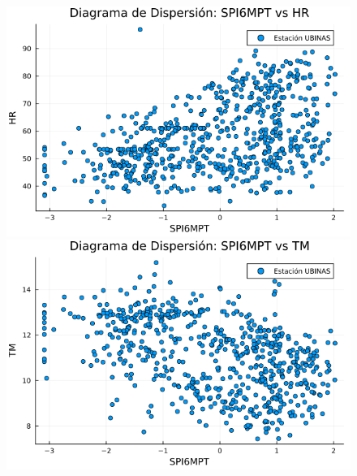 \begin{figure}[htbp]
\begin{minipage}{0.32\textwidth}
\end{minipage}

\vspace{0.5cm}  %

\begin{minipage}{0.32\textwidth}
    \centering
    \includegraphics[width=\linewidth]{Capitulos/Scaterplot/UBINAS_SPI6MPT_vs_HR.png}
\end{minipage}\hfill
\begin{minipage}{0.32\textwidth}
    \centering
    \includegraphics[width=\linewidth]{Capitulos/Scaterplot/UBINAS_SPI6MPT_vs_TM.png}
\end{minipage}\hfill
\begin{minipage}{0.32\textwidth}
    \centering

\end{minipage}
\end{figure}
